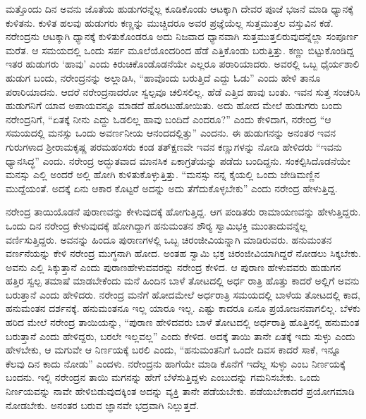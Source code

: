 ಮತ್ತೊಂದು ದಿನ ಅವನು ಜೊತೆಯ ಹುಡುಗರನ್ನೆಲ್ಲ ಕೂಡಿಕೊಂಡು ಆಟಕ್ಕಾಗಿ ದೇವರ ಪೂಜೆ ಭಜನೆ ಮಾಡಿ ಧ್ಯಾನಕ್ಕೆ ಕುಳಿತನು. ಕುಳಿತ ಹಲವು ಹುಡುಗರು ಕಣ್ಣನ್ನು ಮುಚ್ಚಿದರೂ ಅವರ ಪ್ರಜ್ಞೆಯೆಲ್ಲ ಸುತ್ತಮುತ್ತಲ ವಸ್ತುವಿನ ಕಡೆ. ನರೇಂದ್ರನು ಆಟಕ್ಕಾಗಿ ಧ್ಯಾನಕ್ಕೆ ಕುಳಿತುಕೊಂಡರೂ ಅದು ನಿಜವಾದ ಧ್ಯಾನವಾಗಿ ಸುತ್ತಮುತ್ತಲಿರುವುದನ್ನೆಲ್ಲಾ ಸಂಪೂರ್ಣ ಮರೆತ. ಆ ಸಮಯದಲ್ಲಿ ಒಂದು ಸರ್ಪ ಮೂಲೆಯೊಂದರಿಂದ ಹೆಡೆ ಎತ್ತಿಕೊಂಡು ಬರುತ್ತಿತ್ತು. ಕಣ್ಣು ಬಿಟ್ಟುಕೊಂಡಿದ್ದ ಇತರ ಹುಡುಗರು ‘ಹಾವು’ ಎಂದು ಕಿರುಚಿಕೊಂಡೊಡನೆಯೇ ಎಲ್ಲರೂ ಪರಾರಿಯಾದರು. ಅವರಲ್ಲಿ ಒಬ್ಬ ಧೈರ್ಯಶಾಲಿ ಹುಡುಗ ಬಂದು, ನರೇಂದ್ರನನ್ನು ಅಲ್ಲಾಡಿಸಿ, “ಹಾವೊಂದು ಬರುತ್ತಿದೆ ಎದ್ದು ಓಡು” ಎಂದು ಹೇಳಿ ತಾನೂ ಪರಾರಿಯಾದನು. ಆದರೆ ನರೇಂದ್ರನಾದರೋ ಸ್ವಲ್ಪವೂ ಚಲಿಸಲಿಲ್ಲ. ಹೆಡೆ ಎತ್ತಿದ ಹಾವು ಬಂತು. ಇವನ ಸುತ್ತ ಸಂಚರಿಸಿ ಹುಡುಗನಿಗೆ ಯಾವ ಅಪಾಯವನ್ನೂ ಮಾಡದೆ ಹೊರಟುಹೋಯಿತು. ಅದು ಹೋದ ಮೇಲೆ ಹುಡುಗರು ಬಂದು ನರೇಂದ್ರನಿಗೆ, “ಏತಕ್ಕೆ ನೀನು ಎದ್ದು ಓಡಲಿಲ್ಲ ಹಾವು ಬಂದಿದೆ ಎಂದರೂ?” ಎಂದು ಕೇಳಿದಾಗ, ನರೇಂದ್ರ “ಆ ಸಮಯದಲ್ಲಿ ಮನಸ್ಸು ಒಂದು ಅವರ್ಣನೀಯ ಆನಂದದಲ್ಲಿತ್ತು” ಎಂದನು. ಈ ಹುಡುಗನನ್ನು ಅನಂತರ ಇವನ ಗುರುಗಳಾದ ಶ‍್ರೀರಾಮಕೃಷ್ಣ ಪರಮಹಂಸರು ಕಂಡ ತತ್‍ಕ್ಷಣವೇ ಇವನ ಕಣ್ಣುಗಳನ್ನು ನೋಡಿ ಹೇಳಿದರು “ಇವನು ಧ್ಯಾನಸಿದ್ಧ” ಎಂದು. ನರೇಂದ್ರ ಅದ್ಭುತವಾದ ಮಾನಸಿಕ ಏಕಾಗ್ರತೆಯನ್ನು ಪಡೆದು ಬಂದಿದ್ದನು. ಸಂಕಲ್ಪಿಸಿದೊಡನೆಯೇ ಮನಸ್ಸು ಎಲ್ಲಿ ಅಂದರೆ ಅಲ್ಲಿ ಹೋಗಿ ಕುಳಿತುಕೊಳ್ಳುತ್ತಿತ್ತು. “ಮನಸ್ಸು ನನ್ನ ಕೈಯಲ್ಲಿ ಒಂದು ಜೇಡಿಮಣ್ಣಿನ ಮುದ್ದೆಯಂತೆ. ಅದಕ್ಕೆ ಏನು ಆಕಾರ ಕೊಟ್ಟರೆ ಅದನ್ನು ಅದು ತೆಗೆದುಕೊಳ್ಳಬೇಕು” ಎಂದು ನರೇಂದ್ರ ಹೇಳುತ್ತಿದ್ದ.

ನರೇಂದ್ರ ತಾಯಿಯೊಡನೆ ಪುರಾಣವನ್ನು ಕೇಳುವುದಕ್ಕೆ ಹೋಗುತ್ತಿದ್ದ. ಆಗ ಪಂಡಿತರು ರಾಮಾಯಣವನ್ನು ಹೇಳುತ್ತಿದ್ದರು. ಒಂದು ದಿನ ನರೇಂದ್ರ ಕೇಳುವುದಕ್ಕೆ ಹೋಗಿದ್ದಾಗ ಹನುಮಂತನ ಶೌರ‍್ಯ ಸ್ವಾಮಿಭಕ್ತಿ ಮುಂತಾದುವನ್ನೆಲ್ಲ ವರ್ಣಿಸುತ್ತಿದ್ದರು. ಅವನನ್ನು ಹಿಂದೂ ಪುರಾಣಗಳಲ್ಲಿ ಒಬ್ಬ ಚಿರಂಜೀವಿಯನ್ನಾಗಿ ಮಾಡಿರುವರು. ಹನುಮಂತನ ವರ್ಣನೆಯನ್ನು ಕೇಳಿ ನರೇಂದ್ರ ಮುಗ್ಧನಾಗಿ ಹೋದ. ಅಂತಹ ಸ್ವಾಮಿ ಭಕ್ತ ಚಿರಂಜೀವಿಯಾಗಿದ್ದರೆ ನೋಡಲು ಸಿಕ್ಕಬೇಕು. ಅವನು ಎಲ್ಲಿ ಸಿಕ್ಕುತ್ತಾನೆ ಎಂದು ಪುರಾಣ\break ಹೇಳುವವರನ್ನು ನರೇಂದ್ರ ಕೇಳಿದ. ಆ ಪುರಾಣ ಹೇಳುವವರು ಹುಡುಗನ ಹತ್ತಿರ ಸ್ವಲ್ಪ ತಮಾಷೆ ಮಾಡಬೇಕೆಂದು ಮನೆ ಹಿಂದಿನ ಬಾಳೆ ತೋಟದಲ್ಲಿ ಅರ್ಧ ರಾತ್ರಿ ಹೊತ್ತು ಕಾದರೆ ಅಲ್ಲಿಗೆ ಅವನು ಬರುತ್ತಾನೆ ಎಂದು ಹೇಳಿದರು. ನರೇಂದ್ರ ಮನೆಗೆ ಹೋದಮೇಲೆ ಅರ್ಧರಾತ್ರಿ ಸಮಯದಲ್ಲಿ ಬಾಳೆಯ ತೋಟದಲ್ಲಿ ಕಾದ, ಹನುಮಂತನ ದರ್ಶನಕ್ಕೆ. ಹನುಮಂತನೂ ಇಲ್ಲ ಯಾರೂ ಇಲ್ಲ. ಎಷ್ಟು ಕಾದರೂ ಏನೂ ಪ್ರಯೋಜನವಾಗಲಿಲ್ಲ. ಬೆಳಕು ಹರಿದ ಮೇಲೆ ನರೇಂದ್ರ ತಾಯಿಯನ್ನು, “ಪುರಾಣ ಹೇಳಿದವರು ಬಾಳೆ ತೋಟದಲ್ಲಿ ಅರ್ಧರಾತ್ರಿ ಹೊತ್ತಿನಲ್ಲಿ ಹನುಮಂತ ಬರುತ್ತಾನೆ ಎಂದು ಹೇಳಿದ್ದರು, ಬರಲೇ ಇಲ್ಲವಲ್ಲ” ಎಂದು ಕೇಳಿದ. ಅದಕ್ಕೆ ತಾಯಿ ತಾನೇ ಏತಕ್ಕೆ ಇದು ಸುಳ್ಳು ಎಂದು ಹೇಳಬೇಕು, ಆ ಮಗುವೇ ಆ ನಿರ್ಣಯಕ್ಕೆ ಬರಲಿ ಎಂದು, “ಹನುಮಂತನಿಗೆ ಒಂದೇ ದಿವಸ ಕಾದರೆ ಸಾಕೆ, ಇನ್ನೂ ಕೆಲವು ದಿನ ಕಾದು ನೋಡು” ಎಂದಳು. ನರೇಂದ್ರನು ಹಾಗೆಯೇ ಮಾಡಿ ಕೊನೆಗೆ ಇದೆಲ್ಲ ಸುಳ್ಳು ಎಂಬ ನಿರ್ಣಯಕ್ಕೆ ಬಂದನು. ಇಲ್ಲಿ ನರೇಂದ್ರನ ತಾಯಿ ಮಗನನ್ನು ಹೇಗೆ ಬೆಳೆಸುತ್ತಿದ್ದಳು ಎಂಬುದನ್ನು ಗಮನಿಸಬೇಕು. ಒಂದು ನಿರ್ಣಯವನ್ನು ನಾವೇ ಹೇಳಿಬಿಡುವುದಕ್ಕಿಂತ ಅದನ್ನು ವ್ಯಕ್ತಿ ತಾನೇ ಪಡೆಯಬೇಕು. ಪಡೆಯಬೇಕಾದರೆ ಪ್ರಯೋಗಮಾಡಿ ನೋಡಬೇಕು. ಅನಂತರ ಬರುವ ಜ್ಞಾನವೇ ಭದ್ರವಾಗಿ ನಿಲ್ಲುತ್ತದೆ.

